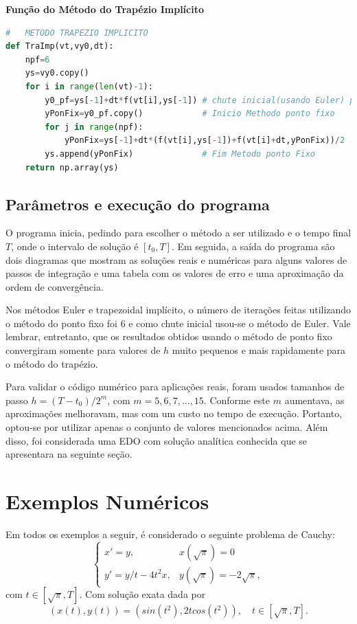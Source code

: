 \documentclass[twocolumn,amsmath,amssymb,floatfix]{revtex4}
\begin{document}
\textbf{Função do Método do Trapézio Implícito}
\begin{lstlisting}[language=Python]
#   METODO TRAPEZIO IMPLICITO
def TraImp(vt,vy0,dt):
    npf=6
    ys=vy0.copy()
    for i in range(len(vt)-1):
        y0_pf=ys[-1]+dt*f(vt[i],ys[-1]) # chute inicial(usando Euler) para usar ponto fixo
        yPonFix=y0_pf.copy()            # Inicio Methodo ponto fixo
        for j in range(npf):
            yPonFix=ys[-1]+dt*(f(vt[i],ys[-1])+f(vt[i]+dt,yPonFix))/2
        ys.append(yPonFix)              # Fim Metodo ponto Fixo
    return np.array(ys)
\end{lstlisting}

\subsection{Parâmetros e execução do programa}
O programa inicia, pedindo para escolher o método a ser utilizado e o tempo final $T$, onde o intervalo de solução é $[t_0,T]$.
Em seguida, a saída do programa são dois diagramas que mostram as soluções reais e numéricas para alguns valores de passos de integração e uma tabela com os valores de erro e uma aproximação da ordem de convergência.

Nos métodos Euler e trapezoidal implícito, o número de iterações feitas utilizando o método do ponto fixo foi $6$ e como chute inicial usou-se o método de Euler. Vale lembrar, entretanto, que os resultados obtidos usando o método de ponto fixo convergiram somente para valores de $h$ muito pequenos e mais rapidamente para o método do trapézio.

Para validar o c\'odigo numérico para aplicações reais, foram usados tamanhos de passo $h=(T-t_0)/2^m$, com $m=5,6,7,...,15$.
Conforme este $m$ aumentava, as aproximações melhoravam, mas com um custo no tempo de execução. Portanto, optou-se por utilizar apenas o conjunto de valores mencionados acima.
Além disso, foi considerada uma EDO com solução analítica conhecida que se apresentara na seguinte seção.

\section{Exemplos Numéricos}\label{sec:exemplosnum}
Em todos os exemplos a seguir, é considerado o seguinte problema de Cauchy:
\begin{equation}\label{eq:EDO}
\left\{\begin{array}{ll}
    x' = y, & x(\sqrt{\pi})=0\\
    y' = y/t-4t^2x, & y(\sqrt{\pi})=-2\sqrt{\pi},
\end{array}\right.
\end{equation}
com $t\in[\sqrt{\pi}, T]$. Com solução exata dada por
\begin{equation}
    (x(t),y(t))=(sin(t^2),2tcos(t^2)),\quad t\in[\sqrt{\pi}, T].
\end{equation}
\end{document}
